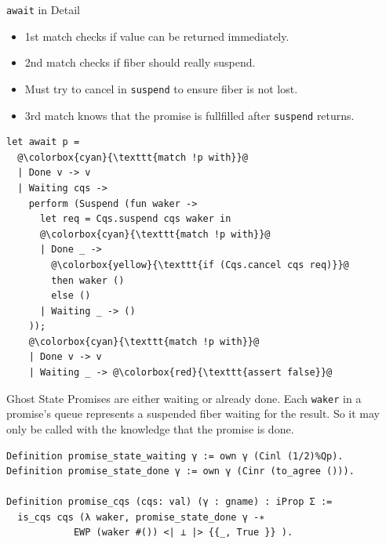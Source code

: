 \documentclass[aspectratio=43]{beamer}
\newcommand{\ocaml}[1]{\texttt{#1}}
\begin{document}
\begin{frame}[fragile]{\ocaml{await} in Detail}
    \begin{adjustwidth}{-2em}{0em}
        \begin{minipage}{0.4\textwidth}
            \begin{itemize}
                \item 1st match checks if value can be returned immediately.
                \item 2nd match checks if fiber should really suspend.
                \item Must try to cancel in \ocaml{suspend} to ensure fiber is not lost.
                \item 3rd match knows that the promise is fullfilled after \ocaml{suspend} returns.
            \end{itemize}
        \end{minipage}
        \begin{minipage}{0.5\textwidth}
            \begin{verbatim}
let await p =
  @\colorbox{cyan}{\texttt{match !p with}}@
  | Done v -> v
  | Waiting cqs ->
    perform (Suspend (fun waker ->
      let req = Cqs.suspend cqs waker in
      @\colorbox{cyan}{\texttt{match !p with}}@
      | Done _ -> 
        @\colorbox{yellow}{\texttt{if (Cqs.cancel cqs req)}}@
        then waker ()
        else ()
      | Waiting _ -> ()
    ));
    @\colorbox{cyan}{\texttt{match !p with}}@
    | Done v -> v
    | Waiting _ -> @\colorbox{red}{\texttt{assert false}}@
\end{verbatim}
        \end{minipage}
    \end{adjustwidth}
\end{frame}

\begin{frame}[fragile]{Ghost State}
    Promises are either waiting or already done.\newline
    Each \ocaml{waker} in a promise's queue represents a suspended fiber waiting for the result. So it may only be called with the knowledge that the promise is done.
    \vspace{0.5em}
    \begin{verbatim}
Definition promise_state_waiting γ := own γ (Cinl (1/2)%Qp).
Definition promise_state_done γ := own γ (Cinr (to_agree ())).

Definition promise_cqs (cqs: val) (γ : gname) : iProp Σ :=
  is_cqs cqs (λ waker, promise_state_done γ -∗
            EWP (waker #()) <| ⊥ |> {{_, True }} ).
\end{verbatim}

\end{frame}
\end{document}
